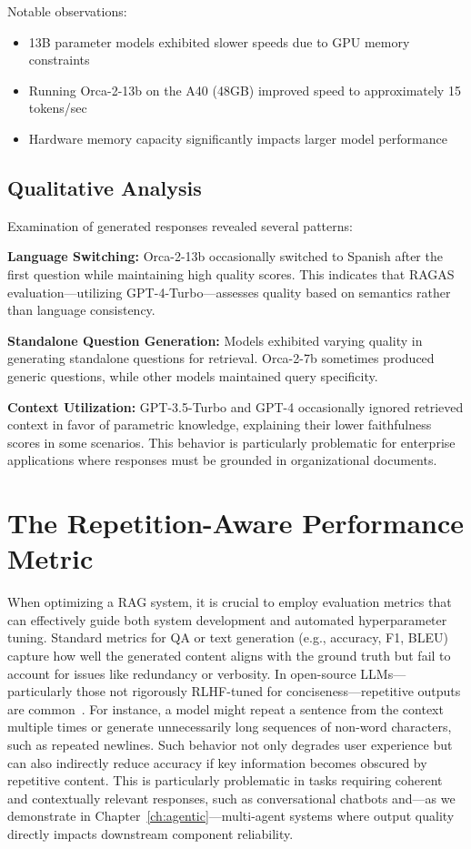Notable observations:
\begin{itemize}[leftmargin=*]
    \item 13B parameter models exhibited slower speeds due to GPU memory constraints
    \item Running Orca-2-13b on the A40 (48GB) improved speed to approximately 15 tokens/sec
    \item Hardware memory capacity significantly impacts larger model performance
\end{itemize}

\subsection{Qualitative Analysis}

Examination of generated responses revealed several patterns:

\textbf{Language Switching:} Orca-2-13b occasionally switched to Spanish after the first question while maintaining high quality scores. This indicates that RAGAS evaluation---utilizing GPT-4-Turbo---assesses quality based on semantics rather than language consistency.

\textbf{Standalone Question Generation:} Models exhibited varying quality in generating standalone questions for retrieval. Orca-2-7b sometimes produced generic questions, while other models maintained query specificity.

\textbf{Context Utilization:} GPT-3.5-Turbo and GPT-4 occasionally ignored retrieved context in favor of parametric knowledge, explaining their lower faithfulness scores in some scenarios. This behavior is particularly problematic for enterprise applications where responses must be grounded in organizational documents.

\section{The Repetition-Aware Performance Metric}
\label{sec:rag_rap}

When optimizing a RAG system, it is crucial to employ evaluation metrics that can effectively guide both system development and automated hyperparameter tuning. Standard metrics for QA or text generation (e.g., accuracy, F1, BLEU) capture how well the generated content aligns with the ground truth but fail to account for issues like redundancy or verbosity. In open-source LLMs---particularly those not rigorously RLHF-tuned for conciseness---repetitive outputs are common~\cite{fu2020repetition}. For instance, a model might repeat a sentence from the context multiple times or generate unnecessarily long sequences of non-word characters, such as repeated newlines. Such behavior not only degrades user experience but can also indirectly reduce accuracy if key information becomes obscured by repetitive content. This is particularly problematic in tasks requiring coherent and contextually relevant responses, such as conversational chatbots and---as we demonstrate in Chapter~\ref{ch:agentic}---multi-agent systems where output quality directly impacts downstream component reliability.

